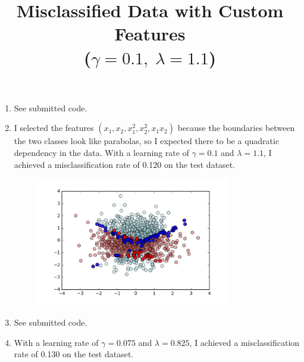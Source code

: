 \documentclass[12pt]{article}
\begin{document}
\begin{enumerate}
\begin{figure}[H]
	\end{figure}
	\item See submitted code.
	\item I selected the features $(x_1, x_2, x_1^2, x_2^2, x_1x_2)$ because the boundaries between the two classes look like parabolas, so I expected there to be a quadratic dependency in the data. With a learning rate of $\gamma = 0.1$ and $\lambda = 1.1$, I achieved a misclassification rate of 0.120 on the test dataset.
	\begin{figure}[H]
		\centering
		\title{\bf Misclassified Data with Custom Features \\
			($\gamma = 0.1, \; \lambda = 1.1$)}
		\includegraphics[width=0.8\textwidth]{../Figures/hw2_3_vi.png}
	\end{figure}
	\item See submitted code.
	\item With a learning rate of $\gamma = 0.075$ and $\lambda = 0.825$, I achieved a misclassification rate of 0.130 on the test dataset.
\end{enumerate}
\end{document}

